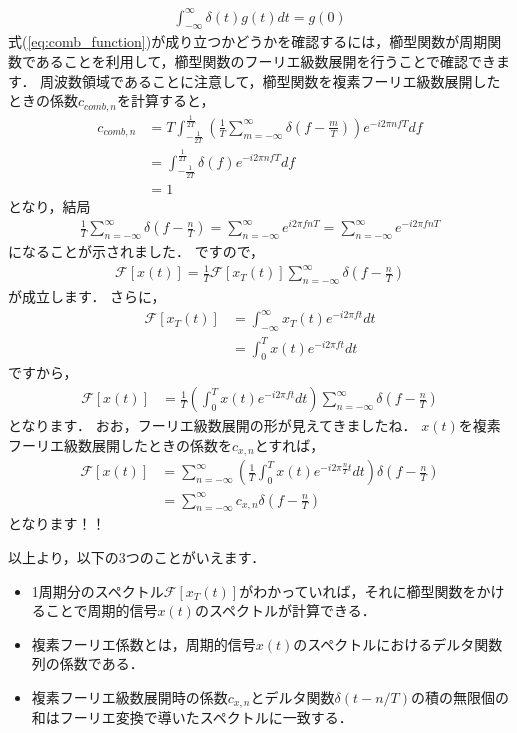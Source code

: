 \begin{align}
\int_{-\infty}^{\infty} \delta(t) g(t) dt = g(0) \label{eq:delta}
\end{align}
式(\ref{eq:comb_function})が成り立つかどうかを確認するには，櫛型関数が周期関数であることを利用して，櫛型関数のフーリエ級数展開を行うことで確認できます．
周波数領域であることに注意して，櫛型関数を複素フーリエ級数展開したときの係数$c_{comb, n}$を計算すると，
\begin{align}
c_{comb, n} &= T \int_{-\frac{1}{2T}}^{\frac{1}{2T}} \left( \frac{1}{T} \sum_{m=-\infty}^{\infty} \delta\left(f - \frac{m}{T}\right) \right) e^{-i 2\pi n f T} df \nonumber\\
    &= \int_{-\frac{1}{2T}}^{\frac{1}{2T}} \delta(f) e^{-i 2\pi n f T} df \nonumber\\
    &= 1
\end{align}
となり，結局
\begin{align}
\frac{1}{T} \sum_{n=-\infty}^{\infty} \delta\left(f - \frac{n}{T}\right) = \sum_{n=-\infty}^{\infty}  e^{i2 \pi f nT} = \sum_{n=-\infty}^{\infty}  e^{-i2 \pi f nT}
\end{align}
になることが示されました．
ですので，
\begin{align}
\mathcal{F}[x(t)] = \frac{1}{T} \mathcal{F}[x_T(t)] \sum_{n=-\infty}^{\infty} \delta\left(f - \frac{n}{T}\right)
\end{align}
が成立します．
さらに，
\begin{align}
\mathcal{F}[x_T(t)] &= \int_{-\infty}^{\infty} x_T(t) e^{-i2\pi ft} dt \nonumber\\
    &= \int_{0}^{T} x(t) e^{-i2\pi ft} dt
\end{align}
ですから，
\begin{align}
\mathcal{F}[x(t)] &= \frac{1}{T} \left(\int_{0}^{T} x(t) e^{-i2\pi ft} dt\right) \sum_{n=-\infty}^{\infty} \delta\left(f - \frac{n}{T}\right)
\end{align}
となります．
おお，フーリエ級数展開の形が見えてきましたね．
$x(t)$を複素フーリエ級数展開したときの係数を$c_{x,n}$とすれば，
\begin{align}
\mathcal{F}[x(t)] &= \sum_{n=-\infty}^{\infty} \left(\frac{1}{T} \int_0^T x(t) e^{-i2\pi \frac{n}{T} t} dt \right) \delta\left(f - \frac{n}{T}\right) \nonumber\\
                  &= \sum_{n=-\infty}^{\infty} c_{x,n} \delta\left(f - \frac{n}{T}\right)
\end{align}
となります！！

以上より，以下の3つのことがいえます．
\begin{itemize}
\item 1周期分のスペクトル$\mathcal{F}[x_T(t)]$がわかっていれば，それに櫛型関数をかけることで周期的信号$x(t)$のスペクトルが計算できる．
\item 複素フーリエ係数とは，周期的信号$x(t)$のスペクトルにおけるデルタ関数列の係数である．
\item 複素フーリエ級数展開時の係数$c_{x,n}$とデルタ関数$\delta(t-n/T)$の積の無限個の和はフーリエ変換で導いたスペクトルに一致する．
\end{itemize}



